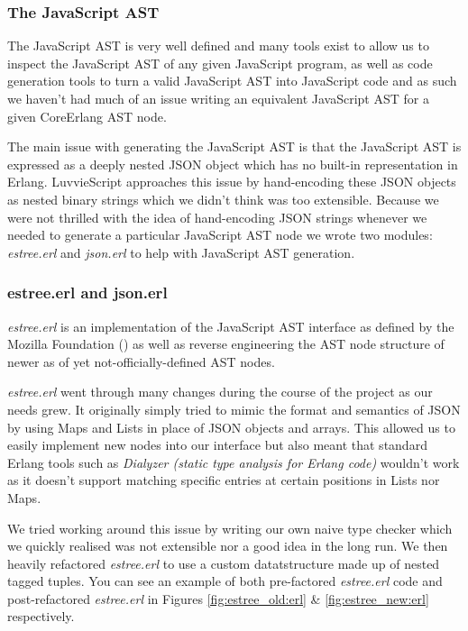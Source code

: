 \documentclass[twoside,12pt,titlepage,a4paper]{article}
\begin{document}
\subsubsection{The JavaScript AST}
The JavaScript AST is very well defined and many tools exist to allow us to inspect the JavaScript AST of any given JavaScript program, as well as code generation tools to turn a valid JavaScript AST into JavaScript code and as such we haven't had much of an issue writing an equivalent JavaScript AST for a given CoreErlang AST node.

The main issue with generating the JavaScript AST is that the JavaScript AST is expressed as a deeply nested JSON object which has no built-in representation in Erlang. LuvvieScript \citep{luvvieGitHub} approaches this issue by hand-encoding these JSON objects as nested binary strings which we didn't think was too extensible. Because we were not thrilled with the idea of hand-encoding JSON strings whenever we needed to generate a particular JavaScript AST node we wrote two modules: \textit{estree.erl} and \textit{json.erl} to help with JavaScript AST generation.

\subsubsection{estree.erl and json.erl}
\textit{estree.erl} is an implementation of the JavaScript AST interface as defined by the Mozilla Foundation (\citeyear{EStreeMDN}) as well as reverse engineering the AST node structure of newer as of yet not-officially-defined AST nodes.

\textit{estree.erl} went through many changes during the course of the project as our needs grew. It originally simply tried to mimic the format and semantics of JSON by using Maps and Lists in place of JSON objects and arrays. This allowed us to easily implement new nodes into our interface but also meant that standard Erlang tools such as \textit{Dialyzer (static type analysis for Erlang code)} wouldn't work as it doesn't support matching specific entries at certain positions in Lists nor Maps. 

We tried working around this issue by writing our own naive type checker which we quickly realised was not extensible nor a good idea in the long run. We then heavily refactored \textit{estree.erl} to use a custom datatstructure made up of nested tagged tuples. You can see an example of both pre-factored \textit{estree.erl} code and post-refactored \textit{estree.erl} in Figures \ref{fig:estree_old:erl} \& \ref{fig:estree_new:erl} respectively.
\end{document}
